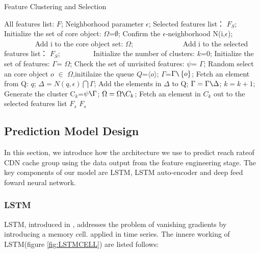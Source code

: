 \documentclass[5p]{elsarticle}
\newcommand{\dabiaolv}{reach rate}
\begin{document}
\begin{algorithm}[t]
\caption{Feature Clustering and Selection} 
\begin{algorithmic}[1]
\Require  
    All features list: $F$;
    Neighborhood parameter $\epsilon$; 
\Ensure  
    Selected features list： $F_S$;  
\State Initialize the set of core object:  $\Omega$=$\emptyset$;
    \State Confirm the $\epsilon$-neighborhood\; N(i,$\epsilon$);
　　　　        \State Add i to the core object set: $\Omega$;
　　        \Else
　　　　        \State Add i to the selected features list： $F_S$;
　　　　    \EndIf
\EndFor
\State Initialize the number of clusters:  $k$=0;
\State Initialize the set of features:  $\Gamma$= $\Omega$;
\While{$\Omega\neq\emptyset$}
\State Check the set of unvisited features: $\psi$= $\Gamma$;
    \State Random select an core object $o$ $\in$ $\Omega$,initilaize the queue $Q$=$\langle o \rangle$;
\State $\Gamma$=$\Gamma \verb|\|\left\{o\right\}$;
    \State Fetch an element from Q: $q$;
    \State $\Delta=N(q,\epsilon)\bigcap\Gamma$;
    \State Add the elements in $\Delta$ to Q;
    \State  $\Gamma= \Gamma\verb|\|\Delta$;
\EndWhile
\State $k=k+1$;
\State Generate the cluster C$_k$=$\psi\verb|\|\Gamma$;
\State $\Omega=\Omega\verb|\|C_k$;
\EndWhile
{}
    \State Fetch an element in $C_k$ out to the selected features list $F_s$
\EndFor
\State \Return $F_s$
\end{algorithmic}
\end{algorithm}


\subsection{Prediction Model Design}

In this section, we introduce how the architecture we use to predict \dabiaolv of CDN cache group using the data output from the feature engineering stage. The key components of our model are LSTM, LSTM auto-encoder and deep feed foward neural network.

\subsubsection{LSTM}
LSTM, introduced in \cite{Hochreiter1997LongMemory}, addresses the problem of vanishing gradients by introducing a memory cell. \cite{MalhotraLongSeries} applied in time series. The innere working of LSTM(figure \ref{fig:LSTMCELL}) are listed follows:
\end{document}
